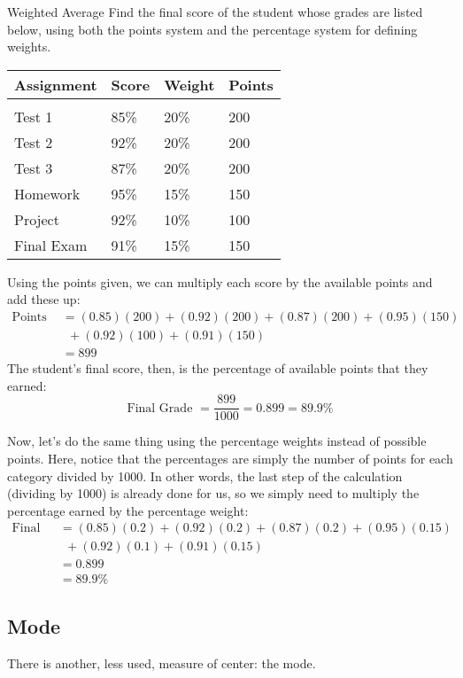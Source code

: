 \begin{example}[https://www.youtube.com/watch?v=9P-fu1MRlIU&list=PLfmpjsIzhzttL_Uec2nCbDRcAcUF7NKG8&index=15]{Weighted Average}
Find the final score of the student whose grades are listed below, using both the points system and the percentage system for defining weights.
\begin{center}
\begin{tabular}{l l l l}
\textbf{Assignment} & \textbf{Score} & \textbf{Weight} & \textbf{Points}\\
\hline
& \\
Test 1 & 85\% & 20\% & 200\\
Test 2 & 92\% & 20\% & 200\\
Test 3 & 87\% & 20\% & 200\\
Homework & 95\% & 15\% & 150\\
Project & 92\% & 10\% & 100\\
Final Exam & 91\% & 15\% & 150
\end{tabular}
\end{center}

\sol
Using the points given, we can multiply each score by the available points and add these up:
\begin{align*}
\textrm{Points earned } &= (0.85)(200) + (0.92)(200) + (0.87)(200) + (0.95)(150)\\
&\ \ + (0.92)(100) + (0.91)(150)\\
&= 899
\end{align*}
The student's final score, then, is the percentage of available points that they earned:
\[\textrm{Final Grade } = \dfrac{899}{1000} = 0.899 = \boxed{89.9\%}\]

Now, let's do the same thing using the percentage weights instead of possible points.  Here, notice that the percentages are simply the number of points for each category divided by 1000.  In other words, the last step of the calculation (dividing by 1000) is already done for us, so we simply need to multiply the percentage earned by the percentage weight:
\begin{align*}
\textrm{Final Grade } &= (0.85)(0.2) + (0.92)(0.2) + (0.87)(0.2) + (0.95)(0.15)\\
&\ \ + (0.92)(0.1) + (0.91)(0.15)\\
&= 0.899\\
&= \boxed{89.9\%}
\end{align*}
\end{example}

\subsection{Mode}
There is another, less used, measure of center: the mode. 

